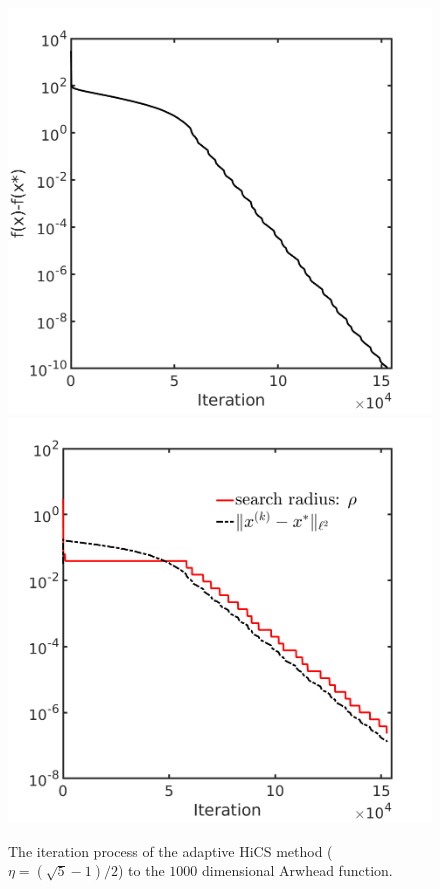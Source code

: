 \documentclass[final,1p,times]{elsarticle}
\begin{document}
\begin{figure}[!htbp]
	\centering
	  \includegraphics[scale=0.25]{../figures/arwhead1000D.png}
	  \includegraphics[scale=0.25]{../figures/arwhead1000D_dist.png}
  \caption{The iteration process of the adaptive HiCS method
  ($\eta=(\sqrt{5}-1)/2$) to the $1000$ dimensional Arwhead function.}
	\label{fig:arwhead}
\end{figure}
\end{document}
